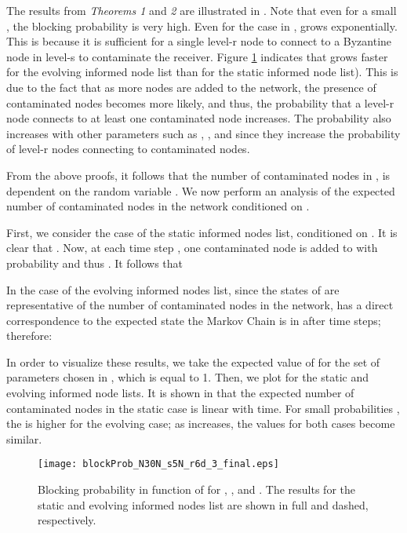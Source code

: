 \vspace{-0.2cm}

The results from \emph{Theorems 1} and \emph{2} are illustrated in . Note that even for a small , the blocking probability  is very high. Even for the case in ,  grows exponentially. This is because it is sufficient for a single level-r node to connect to a Byzantine node in level-s to contaminate the receiver. Figure \ref{fig:theorems} indicates that  grows faster for the evolving informed node list than for the static informed node list). This is due to the fact that as more nodes are added to the network, the presence of contaminated nodes becomes more likely, and thus, the probability that a level-r node connects to at least one contaminated node increases. The probability  also increases with other parameters such as , , and  since they increase the probability of level-r nodes connecting to contaminated nodes.


From the above proofs, it follows that the number of contaminated nodes in , is dependent on the random variable . We now perform an analysis of the expected number of contaminated nodes in the network  conditioned on .

First, we consider the case of the static informed nodes list, conditioned on . It is clear that . Now, at each time step , one contaminated node is added to  with probability  and thus . It follows that


In the case of the evolving informed nodes list, since the states of  are representative of the number of contaminated nodes in the network,  has a direct correspondence to the expected state the Markov Chain is in after  time steps; therefore:

\vspace{-0.5cm}



In order to visualize these results, we take the expected value of  for the set of parameters chosen in , which is equal to 1. Then, we plot  for the static and evolving informed node lists. It is shown in  that the expected number of contaminated nodes in the static case is linear with time. For small probabilities , the  is higher for the evolving case; as  increases, the values for both cases become similar.





\begin{figure}[tbp]
\centering
\texttt{[image: blockProb\_N30N\_s5N\_r6d\_3\_final.eps]}
\caption{Blocking probability in function of  for , ,  and . The results for the static and evolving informed nodes list are shown in full and dashed, respectively.}
\label{fig:theorems}
\vspace{-0.4cm}
\end{figure}

